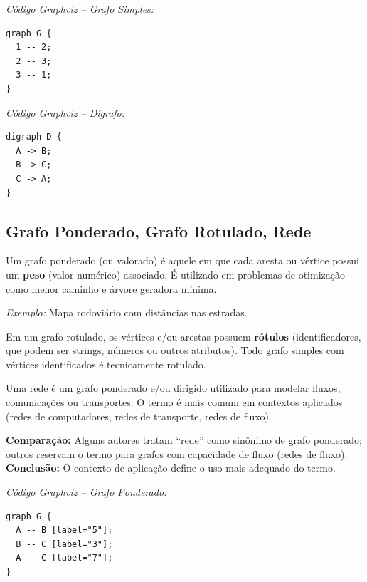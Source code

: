 \documentclass[12pt,a4paper]{article}
\begin{document}
\noindent\textit{Código Graphviz -- Grafo Simples:}
\begin{verbatim}
graph G {
  1 -- 2;
  2 -- 3;
  3 -- 1;
}
\end{verbatim}

\noindent\textit{Código Graphviz -- Dígrafo:}
\begin{verbatim}
digraph D {
  A -> B;
  B -> C;
  C -> A;
}
\end{verbatim}

\subsection{Grafo Ponderado, Grafo Rotulado, Rede}

\begin{description}[leftmargin=0pt]
  \item[Grafo Ponderado] Um grafo ponderado (ou valorado) é aquele em que cada aresta ou vértice possui um \textbf{peso} (valor numérico) associado. É utilizado em problemas de otimização como menor caminho e árvore geradora mínima.

  \textit{Exemplo:} Mapa rodoviário com distâncias nas estradas.

  \item[Grafo Rotulado] Em um grafo rotulado, os vértices e/ou arestas possuem \textbf{rótulos} (identificadores, que podem ser strings, números ou outros atributos). Todo grafo simples com vértices identificados é tecnicamente rotulado.

  \item[Rede] Uma rede é um grafo ponderado e/ou dirigido utilizado para modelar fluxos, comunicações ou transportes. O termo é mais comum em contextos aplicados (redes de computadores, redes de transporte, redes de fluxo).

  \textbf{Comparação:} Alguns autores tratam ``rede'' como sinônimo de grafo ponderado; outros reservam o termo para grafos com capacidade de fluxo (redes de fluxo). \textbf{Conclusão:} O contexto de aplicação define o uso mais adequado do termo.
\end{description}

\noindent\textit{Código Graphviz -- Grafo Ponderado:}
\begin{verbatim}
graph G {
  A -- B [label="5"];
  B -- C [label="3"];
  A -- C [label="7"];
}
\end{verbatim}
\end{document}
